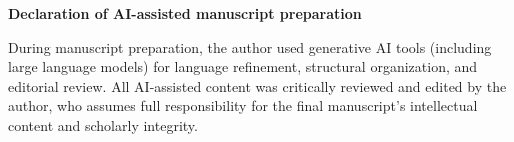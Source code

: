 \documentclass[11pt,a4paper]{article}
\begin{document}
\textbf{Declaration of AI-assisted manuscript preparation}

During manuscript preparation, the author used generative AI tools (including large language models) for language refinement, structural organization, and editorial review. All AI-assisted content was critically reviewed and edited by the author, who assumes full responsibility for the final manuscript's intellectual content and scholarly integrity.



\end{document}
